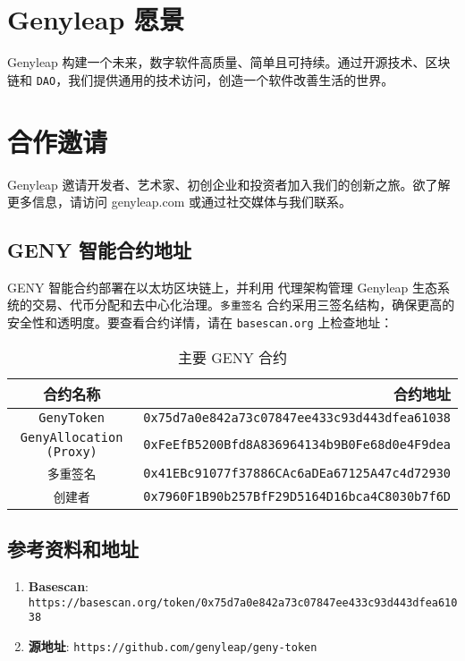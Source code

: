 \documentclass[a4paper,12pt,openany]{book}
\begin{document}
\chapter{Genyleap 愿景}
Genyleap 构建一个未来，数字软件高质量、简单且可持续。通过开源技术、区块链和 \texttt{DAO}，我们提供通用的技术访问，创造一个软件改善生活的世界。

\chapter{合作邀请}
Genyleap 邀请开发者、艺术家、初创企业和投资者加入我们的创新之旅。欲了解更多信息，请访问 genyleap.com 或通过社交媒体与我们联系。

\section*{GENY 智能合约地址}
GENY 智能合约部署在以太坊区块链上，并利用  代理架构管理 Genyleap 生态系统的交易、代币分配和去中心化治理。\texttt{多重签名} 合约采用三签名结构，确保更高的安全性和透明度。要查看合约详情，请在 \texttt{basescan.org} 上检查地址：

\begin{table}[h]
\centering
\caption*{主要 GENY 合约}
\small
\begin{tabular}{c r}
\hline
\textbf{合约名称} & \textbf{合约地址} \\
\hline
\texttt{GenyToken} & {\texttt{0x75d7a0e842a73c07847ee433c93d443dfea61038}} \\
\texttt{GenyAllocation (Proxy)} & {\texttt{0xFeEfB5200Bfd8A836964134b9B0Fe68d0e4F9dea}} \\
\texttt{多重签名} & {\texttt{0x41EBc91077f37886CAc6aDEa67125A47c4d72930}} \\
\texttt{创建者} & {\texttt{0x7960F1B90b257BfF29D5164D16bca4C8030b7f6D}} \\
\hline
\end{tabular}
\end{table}

\section*{参考资料和地址}

\begin{enumerate}
    \item \textbf{Basescan}: \texttt{https://basescan.org/token/0x75d7a0e842a73c07847ee433c93d443dfea61038}
    \item \textbf{源地址}: \texttt{https://github.com/genyleap/geny-token}
\end{enumerate}
\end{document}
